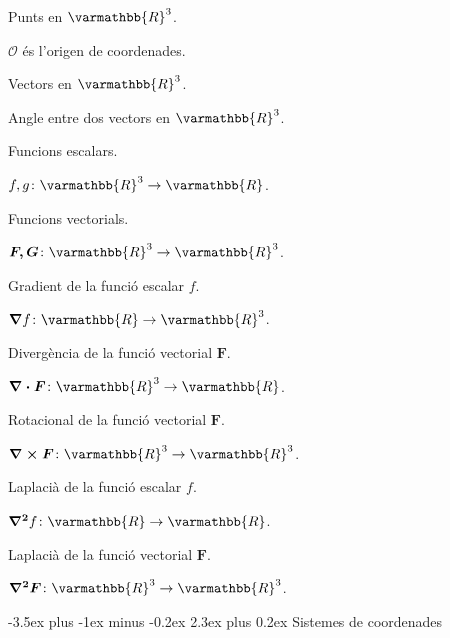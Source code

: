 \documentclass[catalan,a4paper,twoside,11pt]{article}
\makeatletter
\renewcommand{\section}{\@startsection {section}{1}{0pt}%
	{-3.5ex plus -1ex minus -0.2ex}%
	{2.3ex plus 0.2ex}%
	{\Large  \sffamily  \bfseries}}
\makeatother
\begin{document}
\begin{list}{}
   \item[$\mathscr{O}, \mathscr{P}, \mathscr{Q}$] Punts en $\varmathbb{R}^3$. 
   
   $\mathscr{O}$ és l'origen de coordenades.

   \item[$\boldsymbol{A,B,C}$] Vectors en $\varmathbb{R}^3$.

   \item[$\alpha$] Angle entre dos vectors en $\varmathbb{R}^3$.

   \item[$f,g$] Funcions escalars.

   $f,g \colon \varmathbb{R}^3\rightarrow\varmathbb{R}$.

   \item[$\boldsymbol{F,G}$] Funcions vectorials.

   $\boldsymbol{F,G}\colon\varmathbb{R}^3\rightarrow\varmathbb{R}^3$.

   \item[$\boldsymbol{\nabla}f$] Gradient de la funció escalar $f$.

   $\boldsymbol{\nabla}f\colon\varmathbb{R}\rightarrow\varmathbb{R}^3$.

   \item[$\boldsymbol{\nabla\cdot F}$] Divergència de la funció vectorial $\boldsymbol{F}$.

   $\boldsymbol{\nabla\cdot F}\colon \varmathbb{R}^3\rightarrow\varmathbb{R}$.

   \item[$\boldsymbol{\nabla\times F}$] Rotacional de la funció vectorial $\boldsymbol{F}$.

   $\boldsymbol{\nabla\times F}\colon   \varmathbb{R}^3\rightarrow\varmathbb{R}^3$.

   \item[$\boldsymbol{\nabla^2}f$] Laplacià de la funció escalar $f$.

   $\boldsymbol{\nabla^2}f\colon \varmathbb{R}\rightarrow\varmathbb{R}$.

   \item[$\boldsymbol{\nabla^2 F}$] Laplacià de la funció vectorial $\boldsymbol{F}$.

    $\boldsymbol{\nabla^2 F}\colon \varmathbb{R}^3\rightarrow\varmathbb{R}^3$.
\end{list}


\section{Sistemes de coordenades}
\end{document}
